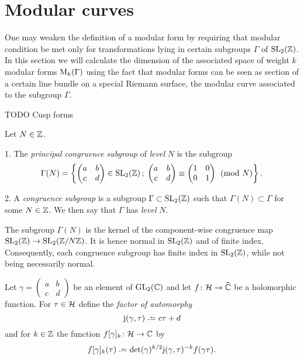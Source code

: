 \section{Modular curves}

\newcommand{\jrm}{\mathrm{j}}

One may weaken the definition of a modular form by requiring that modular condition be met only for transformations lying in certain subgroups $\Gamma$ of $\operatorname{SL}_2(\mathbb{Z})$. In this section we will calculate the dimension of the associated space of weight $k$ modular forms $\mathrm{M}_k(\Gamma)$ using the fact that modular forms can be seen as section of a certain line bundle on a special Riemann surface, the modular curve associated to the subgroup $\Gamma$.

\begin{defi} TODO Cusp forms \end{defi}

\begin{defi}
 Let $N\in \mathbb{Z}$.
 
 1. The \emph{principal congruence subgroup} of \emph{level} $N$ is the subgroup
 \[\Gamma(N)=\left\{\begin{pmatrix} a & b \\ c & d \end{pmatrix}\in\operatorname{SL}_2(\mathbb{Z})\,;\; \begin{pmatrix}a & b \\ c & d\end{pmatrix} \equiv \begin{pmatrix}1 & 0 \\ 0 & 1\end{pmatrix} \pmod{N}\right\}.\]
 
 2. A \emph{congruence subgroup} is a subgroup $\Gamma\subset\operatorname{SL}_2(\mathbb{Z})$ such that $\Gamma(N)\subset\Gamma$ for some $N\in\mathbb{Z}$. We then say that $\Gamma$ has \emph{level} $N$. 
\end{defi}

\begin{rmk}
 The subgroup $\Gamma(N)$ is the kernel of the component-wise congruence map $\operatorname{SL}_2(\mathbb{Z})\to\operatorname{SL}_2(\mathbb{Z}/N\mathbb{Z})$. It is hence normal in $\operatorname{SL}_2(\mathbb{Z})$ and of finite index. Consequently, each congruence subgroup has finite index in $\operatorname{SL}_2(\mathbb{Z})$, while not being necessarily normal.
\end{rmk}

\begin{defi}
 Let $\gamma = \left(\begin{smallmatrix}a & b \\ c & d\end{smallmatrix}\right)$ be an element of $\operatorname{GL}_2(\mathbb{C})$ and let $f\colon\mathcal{H}\to\widehat{\mathbb{C}}$ be a holomorphic function. For $\tau\in\mathcal{H}$ define the \emph{factor of automorphy}
 \[\mathrm{j}(\gamma,\tau)\defeq c\tau+d\]
 and for $k\in \mathbb{Z}$ the function $f[\gamma]_k\colon\mathcal{H}\to\mathbb{C}$ by
 \[f[\gamma]_k(\tau) \defeq \det(\gamma)^{k/2}\jrm(\gamma,\tau)^{-k}f(\gamma\tau).\]
\end{defi}

